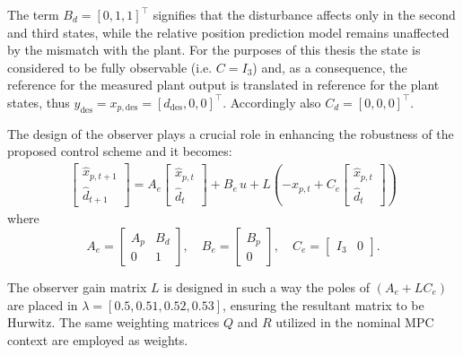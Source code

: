 \documentclass[a4paper,12pt,oneside]{book}
\begin{document}
The term $B_d = [0, 1, 1]^\top$ signifies that the disturbance affects only in the second and third states, while the relative position prediction model remains unaffected by the mismatch with the plant.
For the purposes of this thesis the state is considered to be fully observable (i.e. $C = I_3$) and, as a consequence, the reference for the measured plant output is translated in reference for the plant states, thus $y_{\text{des}} = x_{p,\text{des}} = [d_{\text{des}}, 0, 0] ^\top$.
Accordingly also $C_d = [0, 0, 0]^\top$. 

\bigskip
The design of the observer plays a crucial role in enhancing the robustness of the proposed control scheme and it becomes:
\begin{equation}
    \begin{aligned}
    	\begin{bmatrix}
    	   \hat{x}_{p,t+1} \\
            \hat{d}_{t+1}
        \end{bmatrix}
	= A_e 
        \begin{bmatrix}
        \hat{x}_{p,t} \\
        \hat{d}_t
    	\end{bmatrix}
        + 
        B_e \, u +
        L (
         - x_{p,t} +
        C_e
        \begin{bmatrix}
            \hat{x}_{p,t} \\
            \hat{d}_t
        \end{bmatrix} )
    \end{aligned}
\end{equation}
where
\begin{equation}
    A_e =
    \begin{bmatrix}
        A_p & B_d \\
        0 & 1  
    \end{bmatrix},
    \quad
    B_e = 
    \begin{bmatrix}
        B_p \\
        0  
    \end{bmatrix},
    \quad
    C_e = 
    \begin{bmatrix}
        I_3 & 0 
    \end{bmatrix}.
\label{Observer_real}
\end{equation}

\bigskip
The observer gain matrix $L$ is designed in such a way the poles of $(A_e + L C_e)$ are placed in $\lambda=[0.5, 0.51, 0.52, 0.53]$, ensuring the resultant matrix to be Hurwitz. 
The same weighting matrices $Q$ and $R$ utilized in the nominal MPC context are employed as weights.
\end{document}

